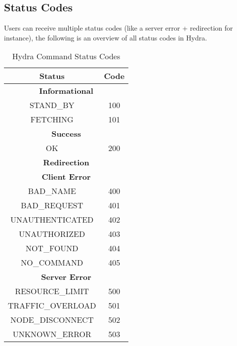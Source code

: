 \subsection{Status Codes} \label{sec:status-codes}

Users can receive multiple status codes (like a server error + redirection for instance), the following is an overview of all status codes in Hydra. 

\begin{table}[]
\caption{Hydra Command Status Codes}
\begin{tabular}{|cc|}
\hline
\multicolumn{1}{|c|}{\textbf{Status}}   & \textbf{Code} \\ \hline
\multicolumn{2}{|c|}{\textbf{Informational}}            \\ \hline
\multicolumn{1}{|c|}{STAND\_BY}         & 100           \\ \hline
\multicolumn{1}{|c|}{FETCHING}          & 101           \\ \hline
\multicolumn{2}{|c|}{\textbf{Success}}                  \\ \hline
\multicolumn{1}{|c|}{OK}                & 200           \\ \hline
\multicolumn{2}{|c|}{\textbf{Redirection}}              \\ \hline
\multicolumn{2}{|c|}{\textbf{Client Error}}             \\ \hline
\multicolumn{1}{|c|}{BAD\_NAME}         & 400           \\ \hline
\multicolumn{1}{|c|}{BAD\_REQUEST}      & 401           \\ \hline
\multicolumn{1}{|c|}{UNAUTHENTICATED}   & 402           \\ \hline
\multicolumn{1}{|c|}{UNAUTHORIZED}      & 403           \\ \hline
\multicolumn{1}{|c|}{NOT\_FOUND}        & 404           \\ \hline
\multicolumn{1}{|c|}{NO\_COMMAND}       & 405           \\ \hline
\multicolumn{2}{|c|}{\textbf{Server Error}}             \\ \hline
\multicolumn{1}{|c|}{RESOURCE\_LIMIT}   & 500           \\ \hline
\multicolumn{1}{|c|}{TRAFFIC\_OVERLOAD} & 501           \\ \hline
\multicolumn{1}{|c|}{NODE\_DISCONNECT}  & 502           \\ \hline
\multicolumn{1}{|c|}{UNKNOWN\_ERROR}    & 503           \\ \hline
\end{tabular}
\label{tab:status-codes}
\end{table}